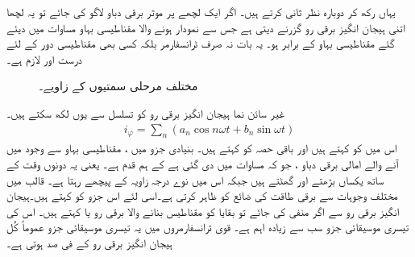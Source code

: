 یہاں رکھ کر دوبارہ نظر ثانی کرتے ہیں۔ اگر ایک  لچھے پر  موثر برقی دباو لاگو کی جائے تو یہ لچھا اتنی ہیجان انگیز برقی رو  گزرنے دیتی ہے جس سے نمودار ہونے والا مقناطیسی بہاو مساوات   میں دیئے گئے مقناطیسی بہاو  کے برابر ہو۔ یہ بات نہ صرف ٹرانسفارمر بلکہ کسی بھی مقناطیسی دور کے لئے درست اور لازم ہے۔
\begin{figure}
\centering
\caption{مختلف مرحلی سمتیوں کے زاویے۔}
\label{شکل_ٹرانسفارمر_مرکزی_ضیاع_اور_مقناطیسی_رو}
\end{figure}

غیر سائن نما ہیجان انگیز برقی رو  کو  تسلسل سے یوں لکھ سکتے ہیں۔
\begin{align} 
i_{\varphi}=\sum_n {\left( a_n \cos n \omega t + b_n \sin \omega t \right)}
\end{align}
اس میں  کو  کہتے ہیں اور باقی حصہ کو    کہتے ہیں۔ بنیادی جزو میں ، مقناطیسی بہاو سے وجود میں آنے والے امالی برقی دباو  ،  جو کہ مساوات  میں دی گئی ہے کے ہم قدم ہے۔ یعنی  یہ دونوں وقت کے ساتھ یکساں بڑھتے اور گھٹتے ہیں جبکہ اس میں  نوے درجہ زاویہ   کے پیچھے رہتا ہے۔ قالب میں مختلف وجوہات سے برقی طاقت کی ضائع  کو  ظاہر  کرتی ہے۔اسی لئے اس جزو کو   کہتے ہیں۔ہیجان انگیز برقی رو  سے اگر  منفی کی جائے تو بقایا کو مقناطیس بنانے والا برقی رو یا  کہتے ہیں۔ اس  کی تیسری موسیقائی جزو سب سے زیادہ اہم  ہے۔ قوی  ٹرانسفارمروں میں یہ تیسری موسیقائی جزو عموماً  کُل ہیجان انگیز برقی رو  کے  فی صد ہوتی ہے۔  


